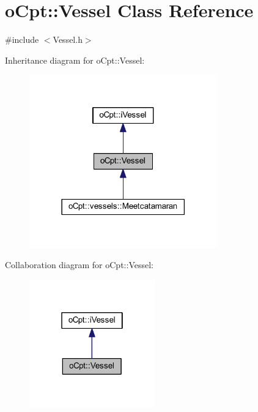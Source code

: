 \hypertarget{classo_cpt_1_1_vessel}{}\section{o\+Cpt\+:\+:Vessel Class Reference}
\label{classo_cpt_1_1_vessel}


{\ttfamily \#include $<$Vessel.\+h$>$}



Inheritance diagram for o\+Cpt\+:\+:Vessel\+:\nopagebreak
\begin{figure}[H]
\begin{center}
\leavevmode
\includegraphics[width=230pt]{classo_cpt_1_1_vessel__inherit__graph}
\end{center}
\end{figure}


Collaboration diagram for o\+Cpt\+:\+:Vessel\+:\nopagebreak
\begin{figure}[H]
\begin{center}
\leavevmode
\includegraphics[width=154pt]{classo_cpt_1_1_vessel__coll__graph}
\end{center}
\end{figure}
